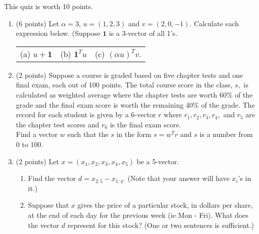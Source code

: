 \documentclass[11pt,fleqn]{article}
\begin{document}
\renewcommand{\headrulewidth}{0pt}
\newcommand{\blank}[1]{\rule{#1}{0.75pt}}
\renewcommand{\d}{\displaystyle}
This quiz is worth 10 points.
\begin{enumerate}
\item (6 points) Let $\alpha=3$, $u=(1,2,3)$ and $v=(2,0,-1).$ Calculate each expression below. (Suppose $\textbf{1}$ is a 3-vector of all 1's.

	\begin{tabular}{lll}
	
	(a) $u+\textbf{1}$ \hspace{1in} &
	(b) $\textbf{1}^Tu$  \hspace{1in} &
	(c) $(\alpha u)^Tv.$
	\end{tabular}

\vfill

\item (2 points) Suppose a course is graded based on five chapter tests and one final exam, each out of 100 points. The total course score in the class, $s,$ is calculated as weighted average where the chapter tests are worth 60\% of the grade and the final exam score is worth the remaining 40\% of the grade. The record for each student is given by a 6-vector $r$ where $r_1, r_2,r_3,r_4,$ and $r_5$ are the chapter test scores and $r_6$ is the final exam score.\\

Find a vector $w$ such that the  $s$ in the form $s=w^T r$ and $s$ is a number from 0 to 100.\\

\vfill

\item (2 points) Let $x=(x_1,x_2,x_3,x_4,x_5)$ be a 5-vector.\\
	\begin{enumerate}
	\item Find the vector $d=x_{2:5}-x_{1:4}.$ (Note that your answer will have $x_i$'s in it.)\\
	\vfill
	
	\item Suppose that $x$ gives the price of a particular stock, in dollars per share, at the end of each day for the previous week (ie Mon - Fri). What does the vector $d$ represent for this stock? (One or two sentences is sufficient.)
	\vfill
	\end{enumerate}
\end{enumerate}
\end{document}
